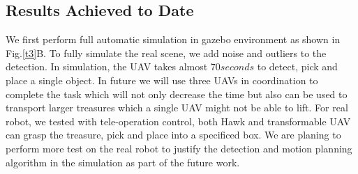 \documentclass{standalone}
\begin{document}
\subsection{Results Achieved to Date}
We first perform full automatic simulation in gazebo environment as shown in Fig.\ref{t3}B. To fully simulate the real scene, we add noise and outliers to the detection. In simulation, the UAV takes almost 70$seconds$ to detect, pick and place a single object. In future we will use three UAVs in coordination to complete the task which will not only decrease the time but also can be used to transport larger treasures which a single UAV might not be able to lift.
For real robot, we tested with tele-operation control, both Hawk and transformable UAV can grasp the treasure, pick and place into a specificed box. We are planing to perform more test on the real robot to justify the detection and motion planning algorithm in the simulation as part of the future work.
\end{document}
